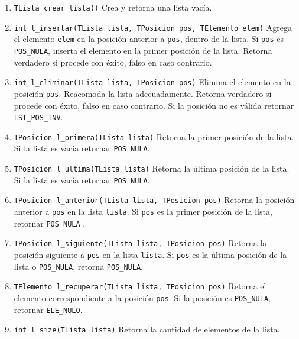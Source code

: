 \documentclass[12pt,a4paper]{article}
\begin{document}
\begin{enumerate}
	
	\item \texttt{TLista crear\_lista()} Crea y retorna una lista vacía.
	
	\item \texttt{int l\_insertar(TLista lista, TPosicion pos, TElemento elem)} Agrega el elemento \texttt{elem} en la posición anterior a \texttt{pos}, dentro de la lista. Si \texttt{pos} es \texttt{POS\_NULA}, inserta el elemento en la primer posición de la lista. Retorna verdadero si procede con éxito, falso en caso contrario.
	
	\item \texttt{int l\_eliminar(TLista lista, TPosicion pos)} Elimina el elemento en la posición \texttt{pos}. Reacomoda la lista adecuadamente. Retorna verdadero si procede con éxito, falso en caso contrario. Si la posición no es válida retornar \texttt{LST\_POS\_INV}.
	
	\item \texttt{TPosicion l\_primera(TLista lista)} Retorna la primer posición de la lista. Si la lista es vacía retornar \texttt{POS\_NULA}.
	
	\item \texttt{TPosicion l\_ultima(TLista lista)} Retorna la última posición de la lista. Si la lista es vacía retornar \texttt{POS\_NULA}.
	
	\item \texttt{TPosicion l\_anterior(TLista lista, TPosicion pos)} Retorna la posición anterior a \texttt{pos} en la lista \texttt{lista}. Si \texttt{pos} es la primer posición de la lista, retornar \texttt{POS\_NULA} .
	
	\item \texttt{TPosicion l\_siguiente(TLista lista, TPosicion pos)} Retorna la posición siguiente a \texttt{pos} en la lista \texttt{lista}. Si \texttt{pos} es la última posición de la lista o \texttt{POS\_NULA}, retorna \texttt{POS\_NULA}.
	
	\item \texttt{TElemento l\_recuperar(TLista lista, TPosicion pos)} Retorna el elemento correspondiente a la posición \texttt{pos}. Si la posición es \texttt{POS\_NULA}, retornar \texttt{ELE\_NULO}.

	\item \texttt{int l\_size(TLista lista)} Retorna la cantidad de elementos de la lista.	
	
\end{enumerate}
\end{document}

